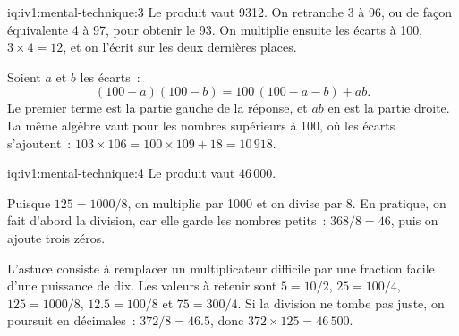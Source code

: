 \begin{solution}{iq:iv1:mental-technique:3}
Le produit vaut 9312. On retranche 3 à 96, ou de façon équivalente 4 à 97, pour obtenir le 93. On multiplie ensuite les écarts à 100, $3 \times 4 = 12$, et on l'écrit sur les deux dernières places.

Soient $a$ et $b$ les écarts~:
\[
(100 - a)(100 - b) = 100\,(100 - a - b) + ab.
\]
Le premier terme est la partie gauche de la réponse, et $ab$ en est la partie droite. La même algèbre vaut pour les nombres supérieurs à 100, où les écarts s'ajoutent~: $103 \times 106 = 100 \times 109 + 18 = 10\,918$.

\end{solution}

\begin{solution}{iq:iv1:mental-technique:4}
Le produit vaut $46\,000$.

Puisque $125 = 1000/8$, on multiplie par 1000 et on divise par 8. En pratique, on fait d'abord la division, car elle garde les nombres petits~: $368 / 8 = 46$, puis on ajoute trois zéros.

L'astuce consiste à remplacer un multiplicateur difficile par une fraction facile d'une puissance de dix. Les valeurs à retenir sont $5 = 10/2$, $25 = 100/4$, $125 = 1000/8$, $12.5 = 100/8$ et $75 = 300/4$. Si la division ne tombe pas juste, on poursuit en décimales~: $372 / 8 = 46.5$, donc $372 \times 125 = 46\,500$.

\end{solution}

